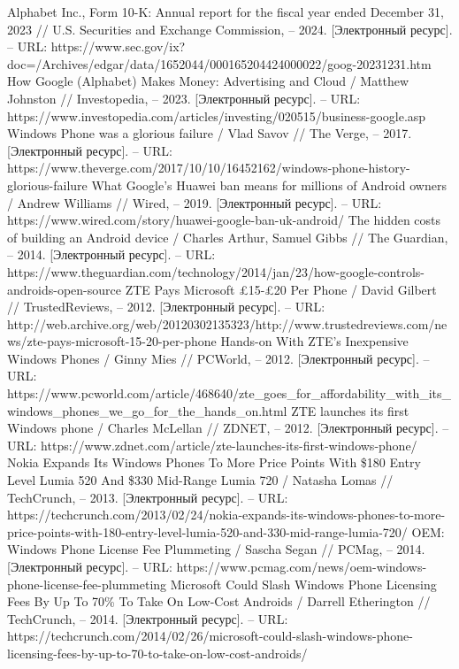 \documentclass{article}
\begin{document}
\begin{thebibliography}{2}
 Alphabet Inc., Form 10-K: Annual report for the fiscal year ended December 31, 2023 // U.S. Securities and Exchange Commission, – 2024. [Электронный ресурс]. – URL: https://www.sec.gov/ix?doc=/Archives/edgar/data/1652044/000165204424000022/goog-20231231.htm
 How Google (Alphabet) Makes Money: Advertising and Cloud / Matthew Johnston // Investopedia, – 2023. [Электронный ресурс]. – URL: https://www.investopedia.com/articles/investing/020515/business-google.asp
 Windows Phone was a glorious failure / Vlad Savov // The Verge, – 2017. [Электронный ресурс]. – URL: https://www.theverge.com/2017/10/10/16452162/windows-phone-history-glorious-failure
 What Google's Huawei ban means for millions of Android owners / Andrew Williams // Wired, – 2019. [Электронный ресурс]. – URL: https://www.wired.com/story/huawei-google-ban-uk-android/
 The hidden costs of building an Android device / Charles Arthur, Samuel Gibbs // The Guardian, – 2014. [Электронный ресурс]. – URL: https://www.theguardian.com/technology/2014/jan/23/how-google-controls-androids-open-source
 ZTE Pays Microsoft £15-£20 Per Phone / David Gilbert // TrustedReviews, – 2012. [Электронный ресурс]. – URL: http://web.archive.org/web/20120302135323/http://www.trustedreviews.com/news/zte-pays-microsoft-15-20-per-phone
 Hands-on With ZTE’s Inexpensive Windows Phones / Ginny Mies // PCWorld, – 2012. [Электронный ресурс]. – URL: https://www.pcworld.com/article/468640/zte\_goes\_for\_affordability\_with\_its\_windows\_phones\_we\_go\_for\_the\_hands\_on.html
 ZTE launches its first Windows phone / Charles McLellan // ZDNET, – 2012. [Электронный ресурс]. – URL: https://www.zdnet.com/article/zte-launches-its-first-windows-phone/
 Nokia Expands Its Windows Phones To More Price Points With \$180 Entry Level Lumia 520 And \$330 Mid-Range Lumia 720 / Natasha Lomas // TechCrunch, – 2013. [Электронный ресурс]. – URL: https://techcrunch.com/2013/02/24/nokia-expands-its-windows-phones-to-more-price-points-with-180-entry-level-lumia-520-and-330-mid-range-lumia-720/
 OEM: Windows Phone License Fee Plummeting / Sascha Segan // PCMag, – 2014. [Электронный ресурс]. – URL: https://www.pcmag.com/news/oem-windows-phone-license-fee-plummeting
 Microsoft Could Slash Windows Phone Licensing Fees By Up To 70\% To Take On Low-Cost Androids / Darrell Etherington // TechCrunch, – 2014. [Электронный ресурс]. – URL: https://techcrunch.com/2014/02/26/microsoft-could-slash-windows-phone-licensing-fees-by-up-to-70-to-take-on-low-cost-androids/

\end{thebibliography}
\end{document}

